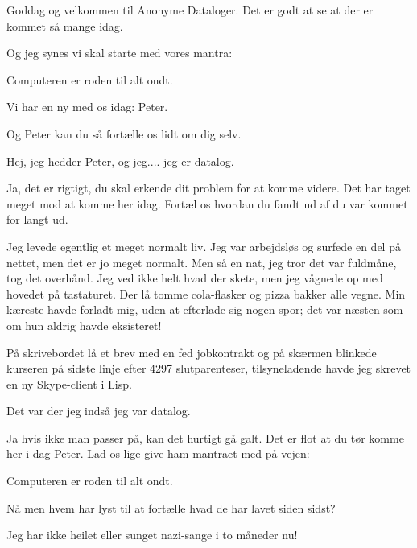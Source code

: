 \documentclass[a4paper,11pt]{article}
\begin{document}
  
\begin{sketch}



 Goddag og velkommen til Anonyme Dataloger. Det er godt at se
at der er kommet så mange idag.

 Og jeg synes vi skal starte med vores mantra: 

 Computeren er roden til alt ondt.

 Vi har en ny med os idag: Peter.

 Og Peter kan du så fortælle os lidt om dig selv.

 Hej, jeg hedder Peter, og jeg....  jeg er
datalog.


 Ja, det er rigtigt, du skal erkende dit problem for at komme
videre. Det har taget meget mod at komme her idag. Fortæl os hvordan
du fandt ud af du var kommet for langt ud.

 Jeg levede egentlig et meget normalt liv. Jeg var arbejdsløs
og surfede en del på nettet, men det er jo meget normalt. Men så en
nat, jeg tror det var fuldmåne, tog det overhånd. Jeg ved ikke helt
hvad der skete, men jeg vågnede op med hovedet på tastaturet. Der lå
tomme cola-flasker og pizza bakker alle vegne. Min kæreste havde
forladt mig, uden at efterlade sig nogen spor; det var næsten som om
hun aldrig havde eksisteret!

 På skrivebordet lå et brev med en fed jobkontrakt og på
skærmen blinkede kurseren på sidste linje efter 4297 slutparenteser,
tilsyneladende havde jeg skrevet en ny Skype-client i Lisp.

 Det var der jeg indså jeg var datalog.


 Ja hvis ikke man passer på, kan det hurtigt gå galt. Det er
flot at du tør komme her i dag Peter. Lad os lige give ham mantraet
med på vejen:

 Computeren er roden til alt ondt.

 Nå men hvem har lyst til at fortælle hvad de har lavet siden sidst?


 Jeg har ikke heilet eller sunget nazi-sange i to måneder nu!


\end{sketch}
\end{document}
